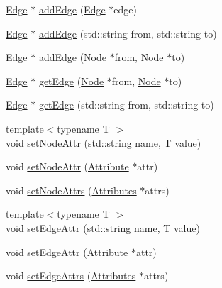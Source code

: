 \begin{DoxyCompactItemize}
\item 
\hyperlink{classmemgraph_1_1_edge}{Edge} $\ast$ \hyperlink{classmemgraph_1_1_graph_component_adb9c519a8743e21a7d45cce42ac841f2}{add\+Edge} (\hyperlink{classmemgraph_1_1_edge}{Edge} $\ast$edge)
\item 
\hyperlink{classmemgraph_1_1_edge}{Edge} $\ast$ \hyperlink{classmemgraph_1_1_graph_component_a6c531ba88cbebb51cab9a453e60edf22}{add\+Edge} (std\+::string from, std\+::string to)
\item 
\hyperlink{classmemgraph_1_1_edge}{Edge} $\ast$ \hyperlink{classmemgraph_1_1_graph_component_a4d4b215e322a641db2b818e59dbf9f99}{add\+Edge} (\hyperlink{classmemgraph_1_1_node}{Node} $\ast$from, \hyperlink{classmemgraph_1_1_node}{Node} $\ast$to)
\item 
\hyperlink{classmemgraph_1_1_edge}{Edge} $\ast$ \hyperlink{classmemgraph_1_1_graph_component_aab65dd00db9278250ec076754d6db112}{get\+Edge} (\hyperlink{classmemgraph_1_1_node}{Node} $\ast$from, \hyperlink{classmemgraph_1_1_node}{Node} $\ast$to)
\item 
\hyperlink{classmemgraph_1_1_edge}{Edge} $\ast$ \hyperlink{classmemgraph_1_1_graph_component_a53b703d7c8a3714b0d201f0a12c2f8bf}{get\+Edge} (std\+::string from, std\+::string to)
\item 
{\footnotesize template$<$typename T $>$ }\\void \hyperlink{classmemgraph_1_1_graph_component_ab6ad58e3e9b39f3b815a5efbc60fea5c}{set\+Node\+Attr} (std\+::string name, T value)
\item 
void \hyperlink{classmemgraph_1_1_graph_component_a614f3f962fbc2227d313d037d8e01c75}{set\+Node\+Attr} (\hyperlink{classmemgraph_1_1_attribute}{Attribute} $\ast$attr)
\item 
void \hyperlink{classmemgraph_1_1_graph_component_a7082f9fac143347572d2a29c578c0d4d}{set\+Node\+Attrs} (\hyperlink{classmemgraph_1_1_attributes}{Attributes} $\ast$attrs)
\item 
{\footnotesize template$<$typename T $>$ }\\void \hyperlink{classmemgraph_1_1_graph_component_a565f576de108c78f5a2509c147d60307}{set\+Edge\+Attr} (std\+::string name, T value)
\item 
void \hyperlink{classmemgraph_1_1_graph_component_ad16b6924c6ad83ad59b4c27da1dbc8c4}{set\+Edge\+Attr} (\hyperlink{classmemgraph_1_1_attribute}{Attribute} $\ast$attr)
\item 
void \hyperlink{classmemgraph_1_1_graph_component_ad58348366c339ad38443a071b7ae7272}{set\+Edge\+Attrs} (\hyperlink{classmemgraph_1_1_attributes}{Attributes} $\ast$attrs)

\end{DoxyCompactItemize}
